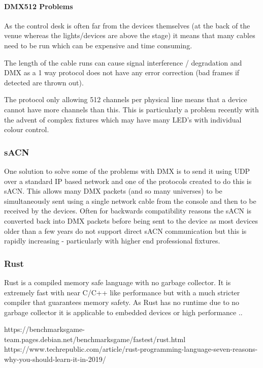 \documentclass[11pt,a4paper,notitlepage]{report}
\begin{document}
	\paragraph*{DMX512 Problems}
	\begin{list}{}{}
		\item As the control desk is often far from the devices themselves (at the back of the venue whereas the lights/devices are above the stage) it means that many cables need to be run which can be expensive and time consuming.
		\item The length of the cable runs can cause signal interference / degradation and DMX as a 1 way protocol does not have any error correction (bad frames if detected are thrown out).
		\item The protocol only allowing 512 channels per physical line means that a device cannot have more channels than this. This is particularly a problem recently with the advent of complex fixtures which may have many LED's with individual colour control.
	\end{list}
	
	\subsubsection{sACN}
	One solution to solve some of the problems with DMX is to send it using UDP over a standard IP based network and one of the protocols created to do this is sACN. This allows many DMX packets (and so many universes) to be simultaneously sent using a single network cable from the console and then to be received by the devices. Often for backwards compatibility reasons the sACN is converted back into DMX packets before being sent to the device as most devices older than a few years do not support direct sACN communication but this is rapidly increasing - particularly with higher end professional fixtures. 
	
	\subsubsection{Rust}
	Rust \cite{RUST_LANG} is a compiled memory safe language with no garbage collector. It is extremely fast with near C/C++ like performance \cite{RUST_C_COMPARISON} but with a much stricter compiler that guarantees memory safety. As Rust has no runtime due to no garbage collector it is applicable to embedded devices or high performance .. 
	
	https://benchmarksgame-team.pages.debian.net/benchmarksgame/fastest/rust.html
	https://www.techrepublic.com/article/rust-programming-language-seven-reasons-why-you-should-learn-it-in-2019/
	
\end{document}
